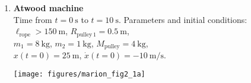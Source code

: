 \documentclass[11pt, a4paper, twoside]{article}
\begin{document}
\begin{enumerate}


\item 
\begin{minipage}[t][2.5cm]{0.7\textwidth}
\textbf{Atwood machine}\\
Time from \(t = \SI{0}{\second}\) to \(t = \SI{10}{\second}\).
Parameters and initial conditions:\\
\(\ell_\mathrm{rope} > \SI{150}{\metre}\), 
\(R_{\mathrm{pulley}\,1} = \SI{0.5}{\metre}\), \\ 
\(m_1 = \SI{8}{\kilo\gram}\), 
\(m_2 = \SI{1}{\kilo\gram}\), 
\(M_\mathrm{pulley} = \SI{4}{\kilo\gram}\), \\
\(x(t=0) = \SI{25}{\metre}\), 
\(\dot{x}(t=0) = -\SI{10}{\metre\per\second}\).
\end{minipage}
\begin{minipage}[c][2cm][t]{0.3\textwidth}
	\hspace{0.5cm}
	\texttt{[image: figures/marion\_fig2\_1a]}
\end{minipage}




\end{enumerate}
\end{document}
